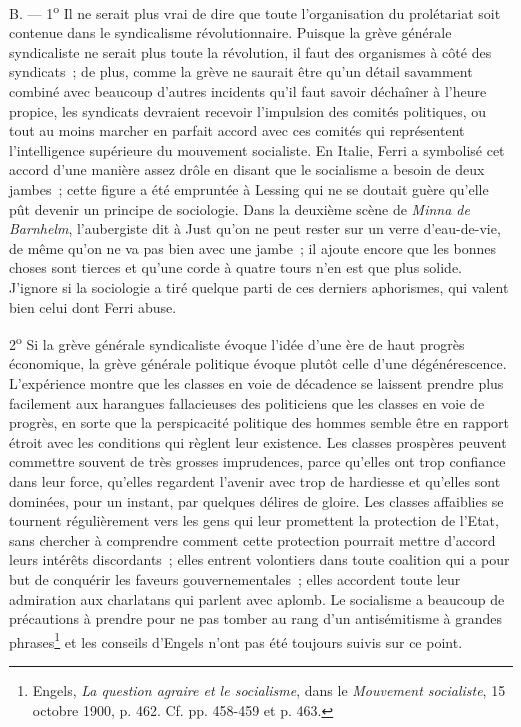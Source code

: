 \documentclass[french,twoside]{book} %
\begin{document}
 B. — 1\textsuperscript{o} Il ne serait plus vrai de dire que toute l’organisation du prolétariat soit contenue dans le syndicalisme révolutionnaire. Puisque la grève générale syndicaliste ne serait plus toute la révolution, il faut des organismes à côté des syndicats ; de plus, comme la grève ne saurait être qu’un détail savamment combiné avec beaucoup d’autres incidents qu’il faut savoir déchaîner à l’heure propice, les syndicats devraient recevoir l’impulsion des comités politiques, ou tout au moins marcher en parfait accord avec ces comités qui représentent l’intelligence supérieure du mouvement socialiste. En Italie, Ferri a symbolisé cet accord d’une manière assez drôle en disant que le socialisme a besoin de deux jambes ; cette figure a été empruntée à Lessing qui ne se doutait guère qu’elle pût devenir un principe de sociologie. Dans la deuxième scène de \emph{Minna de Barnhelm}, l’aubergiste dit à Just qu’on ne peut rester sur un verre d’eau-de-vie, de même qu’on ne va pas bien avec une jambe ; il ajoute encore que les bonnes choses sont tierces et qu’une corde à quatre tours n’en est que plus solide. J’ignore si la sociologie a tiré quelque parti de ces derniers aphorismes, qui valent bien celui dont Ferri abuse.\par
2\textsuperscript{o} Si la grève générale syndicaliste évoque l’idée d’une ère de haut progrès économique, la grève générale politique  évoque plutôt celle d’une dégénérescence. L’expérience montre que les classes en voie de décadence se laissent prendre plus facilement aux harangues fallacieuses des politiciens que les classes en voie de progrès, en sorte que la perspicacité politique des hommes semble être en rapport étroit avec les conditions qui règlent leur existence. Les classes prospères peuvent commettre souvent de très grosses imprudences, parce qu’elles ont trop confiance dans leur force, qu’elles regardent l’avenir avec trop de hardiesse et qu’elles sont dominées, pour un instant, par quelques délires de gloire. Les classes affaiblies se tournent régulièrement vers les gens qui leur promettent la protection de l’Etat, sans chercher à comprendre comment cette protection pourrait mettre d’accord leurs intérêts discordants ; elles entrent volontiers dans toute coalition qui a pour but de conquérir les faveurs gouvernementales ; elles accordent toute leur admiration aux charlatans qui parlent avec aplomb. Le socialisme a beaucoup de précautions à prendre pour ne pas tomber au rang d’un antisémitisme à grandes phrases\footnote{ \noindent Engels, \emph{La question agraire et le socialisme}, dans le \emph{Mouvement socialiste}, 15 octobre 1900, p. 462. Cf. pp. 458-459 et p. 463.
 } et les conseils d’Engels n’ont pas été toujours suivis sur ce point.\par
\end{document}
